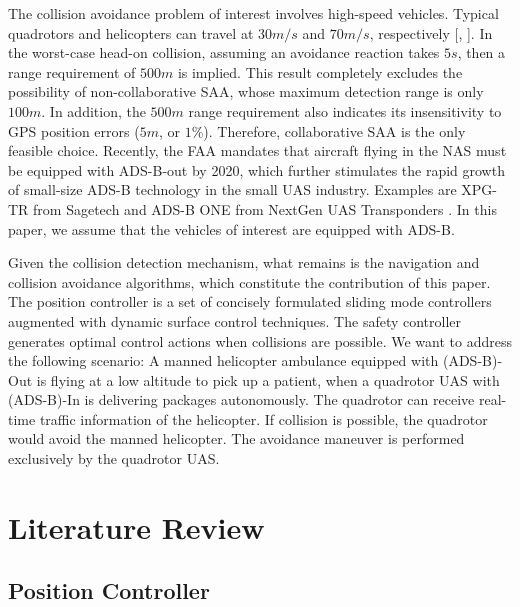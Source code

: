 \documentclass[journal,11pt,onecolumn,draftclsnofoot,]{IEEEtran}
\begin{document}
The collision avoidance problem of interest involves high-speed vehicles. Typical quadrotors and helicopters can travel at $30m/s$ and $70m/s$, respectively [, ]. In the worst-case head-on collision, assuming an avoidance reaction takes $5s$, then a range requirement of $500m$ is implied. This result completely excludes the possibility of non-collaborative SAA, whose maximum detection range is only $100 m$. In addition, the $500m$ range requirement also indicates its insensitivity to GPS position errors ($5m$, or $1\%$). Therefore, collaborative SAA is the only feasible choice. Recently, the FAA mandates that aircraft flying in the NAS must be equipped with ADS-B-out by 2020, which further stimulates the rapid growth of small-size ADS-B technology in the small UAS industry. Examples are XPG-TR from Sagetech \cite{sagetech} and ADS-B ONE from NextGen UAS Transponders \cite{ads-b-one}. In this paper, we assume that the vehicles of interest are equipped with ADS-B.

Given the collision detection mechanism, what remains is the navigation and collision avoidance algorithms, which constitute the contribution of this paper. The position controller is a set of concisely formulated sliding mode controllers augmented with dynamic surface control techniques. The safety controller generates optimal control actions when collisions are possible. We want to address the following scenario: A manned helicopter ambulance equipped with (ADS-B)-Out is flying at a low altitude to pick up a patient, when a quadrotor UAS with (ADS-B)-In is delivering packages autonomously. The quadrotor can receive real-time traffic information of the helicopter. If collision is possible, the quadrotor would avoid the manned helicopter. The avoidance maneuver is performed exclusively by the quadrotor UAS.

\section{\textbf{Literature Review}}

\subsection{Position Controller} \label{sec:pos_ctrl}
\end{document}
